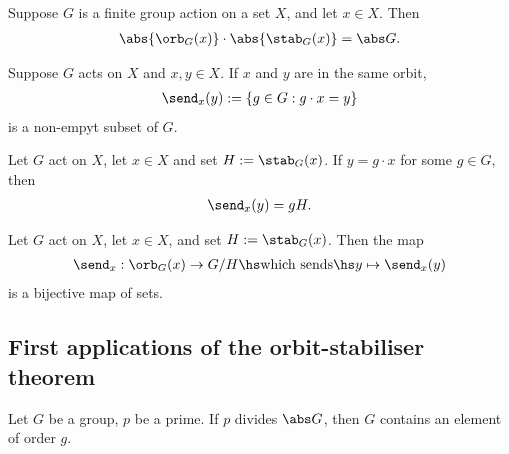 \documentclass{article}
\begin{document}
\begin{theorem}
    Suppose $G$ is a finite group action on a set $X$, and let $x\in X$.
    Then 
    \begin{align*}
        \abs{\orb_G(x)}\cdot \abs{\stab_G(x)}=\abs G. 
    \end{align*}
\end{theorem}

\begin{definition}
    Suppose $G$ acts on $X$ and $x,y\in X$. If $x$ and $y$
    are in the same orbit,
    \begin{align*}
        \send_x(y):=\{g\in G : g\cdot x = y\}
    \end{align*}
    is a non-empyt subset of $G$.
\end{definition}

\begin{proposition}
    Let $G$ act on $X$, let $x\in X$ and set $H:=\stab_G(x)$.
    If $y=g\cdot x$ for some $g\in G$, then
    \begin{align*}
        \send_x(y) = gH.
    \end{align*}
\end{proposition}

\begin{theorem}
    Let $G$ act on $X$, let $x\in X$, and set $H:=\stab_G(x)$.
    Then the map
    \begin{align*}
        \send_x:\orb_G(x)\to G/H \hs\text{which sends}\hs y\mapsto \send_x(y)
    \end{align*}
    is a bijective map of sets.
\end{theorem}

\subsection{First applications of the orbit-stabiliser theorem}

\begin{theorem}
    Let $G$ be a group, $p$ be a prime. If $p$ divides $\abs G$,
    then $G$ contains an element of order $g$. 
\end{theorem}
\end{document}
